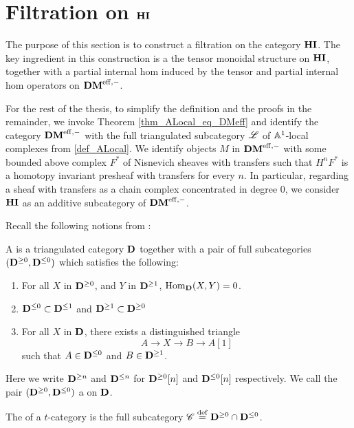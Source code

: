 \newpage
\section{Filtration on $\mathbf{HI}$}\label{sect_filtration_hi}

The purpose of this section is to construct a filtration on the 
category $\mathbf{HI}$. The key ingredient in this construction is a 
the tensor monoidal structure on $\mathbf{HI}$, together with a partial
internal hom induced by the tensor and partial internal hom
operators on $\mathbf{DM}^{\mathrm{eff},-}$. 

For the rest of the thesis, to simplify the definition and the 
proofs in the remainder, we invoke Theorem 
\ref{thm_ALocal_eq_DMeff} and identify the category $\mathbf{DM}^{\mathrm{eff},-}$ with 
the full triangulated subcategory $\mathscr{L}$ of $\mathbb{A}^1$-local 
complexes from \ref{def_ALocal}. We identify objects $M$ in 
$\mathbf{DM}^{\mathrm{eff},-}$ with some bounded above complex $F^*$ of Nisnevich 
sheaves with transfers such that $H^nF^*$ is a homotopy invariant 
presheaf with transfers for every $n$. In particular, regarding
a sheaf with transfers as a chain complex concentrated in degree 
0, we consider $\mathbf{HI}$ as an additive subcategory of $\mathbf{DM}^{\mathrm{eff},-}$.

Recall the following notions from \cite[1.3]{BBD}:

\begin{defn}\label{def_t_struct}
A  is a triangulated category $\mathbf{D}$ together
with a pair of full subcategories $(\mathbf{D}^{\geq 0}, 
\mathbf{D}^{\leq 0})$ which satisfies the following:
\begin{enumerate}
\item For all $X$ in $\mathbf{D}^{\geq 0}$, and $Y$ in $\mathbf{D}^{\geq 1}$, 
$\mathrm{Hom}_{\mathbf{D}}(X, Y) = 0$.

\item $\mathbf{D}^{\leq 0} \subset \mathbf{D}^{\leq 1}$ and
$\mathbf{D}^{\geq 1} \subset \mathbf{D}^{\geq 0}$

\item For all $X$ in $\mathbf{D}$, there exists a distinguished 
triangle
\[
A \to X \to B \to A[1]
\]
such that $A \in \mathbf{D}^{\leq 0}$ and $B \in \mathbf{D}^{\geq 1}$.
\end{enumerate}
\noindent Here we write $\mathbf{D}^{\geq n}$ and $\mathbf{D}^{\leq n}$ for 
$\mathbf{D}^{\geq 0}[n]$ and $\mathbf{D}^{\leq 0}[n]$ respectively. We call
the pair $(\mathbf{D}^{\geq 0}, \mathbf{D}^{\leq 0})$ a  
on $\mathbf{D}$.

The  of a $t$-category is the full subcategory
$\mathscr{C} \stackrel{\mathrm{def}}{=} \mathbf{D}^{\geq 0} \cap \mathbf{D}^{\leq 0}$.
\end{defn}

